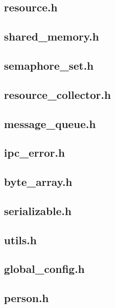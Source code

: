 \subsection*{resource.h}
\scriptsize
\subsection*{shared_memory.h}
\scriptsize
\subsection*{semaphore_set.h}
\scriptsize
\subsection*{resource_collector.h}
\scriptsize
\subsection*{message_queue.h}
\scriptsize
\subsection*{ipc_error.h}
\scriptsize
\subsection*{byte_array.h}
\scriptsize
\subsection*{serializable.h}
\scriptsize
\subsection*{utils.h}
\scriptsize
\subsection*{global_config.h}
\scriptsize
\subsection*{person.h}
\scriptsize
